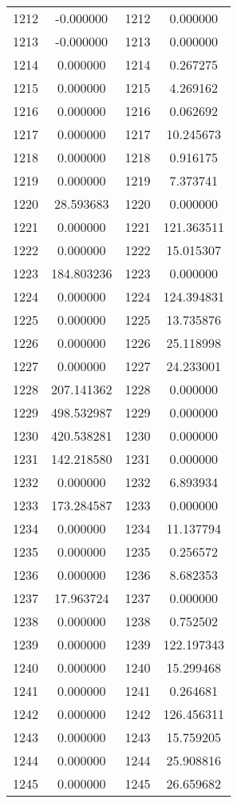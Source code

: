 \documentclass[12pt]{article}
\begin{document}
\begin{longtable}{@{}cccc@{}}
1212 & -0.000000 & 1212 & 0.000000 \\
1213 & -0.000000 & 1213 & 0.000000 \\
1214 & 0.000000 & 1214 & 0.267275 \\
1215 & 0.000000 & 1215 & 4.269162 \\
1216 & 0.000000 & 1216 & 0.062692 \\
1217 & 0.000000 & 1217 & 10.245673 \\
1218 & 0.000000 & 1218 & 0.916175 \\
1219 & 0.000000 & 1219 & 7.373741 \\
1220 & 28.593683 & 1220 & 0.000000 \\
1221 & 0.000000 & 1221 & 121.363511 \\
1222 & 0.000000 & 1222 & 15.015307 \\
1223 & 184.803236 & 1223 & 0.000000 \\
1224 & 0.000000 & 1224 & 124.394831 \\
1225 & 0.000000 & 1225 & 13.735876 \\
1226 & 0.000000 & 1226 & 25.118998 \\
1227 & 0.000000 & 1227 & 24.233001 \\
1228 & 207.141362 & 1228 & 0.000000 \\
1229 & 498.532987 & 1229 & 0.000000 \\
1230 & 420.538281 & 1230 & 0.000000 \\
1231 & 142.218580 & 1231 & 0.000000 \\
1232 & 0.000000 & 1232 & 6.893934 \\
1233 & 173.284587 & 1233 & 0.000000 \\
1234 & 0.000000 & 1234 & 11.137794 \\
1235 & 0.000000 & 1235 & 0.256572 \\
1236 & 0.000000 & 1236 & 8.682353 \\
1237 & 17.963724 & 1237 & 0.000000 \\
1238 & 0.000000 & 1238 & 0.752502 \\
1239 & 0.000000 & 1239 & 122.197343 \\
1240 & 0.000000 & 1240 & 15.299468 \\
1241 & 0.000000 & 1241 & 0.264681 \\
1242 & 0.000000 & 1242 & 126.456311 \\
1243 & 0.000000 & 1243 & 15.759205 \\
1244 & 0.000000 & 1244 & 25.908816 \\
1245 & 0.000000 & 1245 & 26.659682 \\

\end{longtable}
\end{document}
